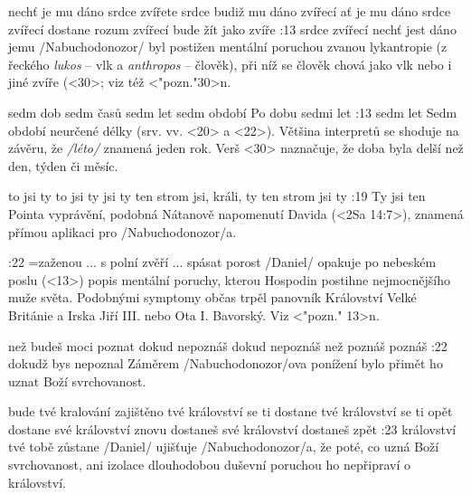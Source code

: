     {nechť je mu dáno srdce zvířete}   %
    {srdce budiž mu dáno zvířecí}   %
    {ať je mu dáno srdce zvířecí}   %
    {dostane rozum zvířecí}   %
    {bude žít jako zvíře}   %
:13 {srdce zvířecí nechť jest dáno jemu} 
     \x/Nabuchodonozor/  byl postižen mentální poruchou zvanou lykantropie 
     (z řeckého {\em lukos} -- vlk a {\em anthropos} -- člověk), 
     při níž  se člověk chová jako vlk nebo i jiné zvíře (<30>; viz též <"pozn."30>n. 

    {sedm dob}   %
    {sedm časů}   %
    {sedm let}   %
    {sedm období}   %
    {Po dobu sedmi let}   %
:13 {sedm let} 
     Sedm období neurčené délky (srv. vv. <20> a <22>). Většina interpretů se shoduje na závěru, že {\em \x/léto/} znamená jeden rok. Verš <30> naznačuje, že doba byla delší než den, týden či měsíc.

    {to jsi ty}   %
    {to jsi ty}   %
    {jsi ty}   %
    {ten strom jsi, králi, ty}   %
    {ten strom jsi ty}   %
:19 {Ty jsi ten} Pointa vyprávění, podobná Nátanově napomenutí Davida (<2Sa 14:7>), znamená přímou aplikaci pro \x/Nabuchodonozor/a.

:22 {}={zaženou ... s polní zvěří ... spásat porost}  \x/Daniel/ opakuje po nebeském poslu (<13>) popis mentální poruchy, kterou Hospodin postihne nejmocnějšího muže světa. Podobnými symptomy občas trpěl panovník Království Velké Británie a Irska Jiří III. nebo Ota I. Bavorský. Viz <"pozn." 13>n.

    {než budeš moci poznat}   %
    {dokud nepoznáš}   %
    {dokud nepoznáš} %
    {než poznáš}   %
    {poznáš}   %
:22 {dokudž bys nepoznal} Záměrem \x/Nabuchodonozor/ova ponížení bylo přimět ho uznat Boží svrchovanost. 

    {bude tvé kralování zajištěno}   %
    {tvé království se ti dostane}   %
    {tvé království se ti opět dostane}   %
    {své království znovu dostaneš}   %
    {své království dostaneš zpět}   %
:23 {království tvé tobě zůstane} \x/Daniel/ ujišťuje \x/Nabuchodonozor/a, že poté, co uzná Boží svrchovanost, ani izolace dlouhodobou duševní poruchou ho nepřipraví o království.

